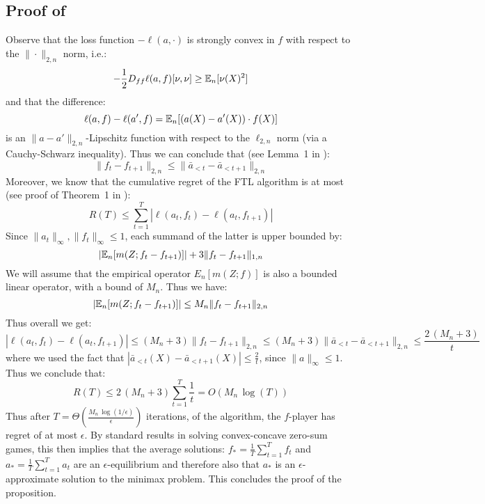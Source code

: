 \subsection{Proof of }


Observe that the loss function $-\ell(a, \cdot)$ is strongly convex in $f$ with respect to the $\|\cdot\|_{2,n}$ norm, i.e.:
\begin{equation}
    -\frac{1}{2} D_{ff} \ell(a, f)[\nu, \nu] \geq \mathbb{E}_n[\nu(X)^2]
\end{equation}
and that the difference:
\begin{equation}
    \ell(a, f) - \ell(a', f) = \mathbb{E}_n[(a(X)-a'(X))\cdot f(X)]
\end{equation}
is an $\|a-a'\|_{2,n}$-Lipschitz function with respect to the $\ell_{2,n}$ norm (via a Cauchy-Schwarz inequality). Thus we can conclude that (see Lemma~1 in \cite{syrgkanis}):
\begin{equation}
    \|f_t - f_{t+1}\|_{2,n} \leq \|\bar{a}_{<t} - \bar{a}_{<t+1}\|_{2, n}
\end{equation}
Moreover, we know that the cumulative regret of the FTL algorithm is at most (see proof of Theorem~1 in \cite{syrgkanis}):
\begin{equation}
    R(T) \leq \sum_{t=1}^T \left|\ell(a_t, f_t) - \ell(a_t, f_{t+1})\right|
\end{equation}
Since $\|a_t\|_{\infty}, \|f_t\|_{\infty} \leq 1$, each summand of the latter is upper bounded by:
\begin{equation}
    \left|\mathbb{E}_n[m(Z; f_t - f_{t+1})]\right| + 3\|f_t - f_{t+1}\|_{1,n}
\end{equation}
We will assume that the empirical operator $E_n[m(Z; f)]$ is also a bounded linear operator, with a bound of $M_n$. Thus we have: 
\begin{equation}
    \left|\mathbb{E}_n[m(Z; f_t - f_{t+1})]\right| \leq M_n \|f_t - f_{t+1}\|_{2,n}
\end{equation}
Thus overall we get:
\begin{equation}
     \left|\ell(a_t, f_t) - \ell(a_t, f_{t+1})\right| \leq (M_n+3) \|f_t - f_{t+1}\|_{2,n} \leq (M_n+3) \|\bar{a}_{<t} - \bar{a}_{<t+1}\|_{2,n} \leq \frac{2\,(M_n+3)}{t}
\end{equation}
where we used the fact that $\left|\bar{a}_{<t}(X) - \bar{a}_{<t+1}(X)\right|\leq \frac{2}{t}$, since $\|a\|_{\infty}\leq 1$. Thus we conclude that:
\begin{equation}
    R(T) \leq 2\,(M_n+3)\sum_{t=1}^T \frac{1}{t} = O(M_n\, \log(T))
\end{equation}
Thus after $T=\Theta\left(\frac{M_n\, \log(1/\epsilon)}{\epsilon}\right)$ iterations, of the algorithm, the $f$-player has regret of at most $\epsilon$. By standard results in solving convex-concave zero-sum games, this then implies that the average solutions: $f_*=\frac{1}{T}\sum_{t=1}^T f_t$ and $a_* = \frac{1}{T} \sum_{t=1}^T a_t$ are an $\epsilon$-equilibrium and therefore also that $a_*$ is an $\epsilon$-approximate solution to the minimax problem. This concludes the proof of the proposition.


